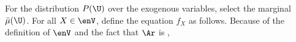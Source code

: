 {%
%
For the distribution $P(\U)$ over the exogenous variables, 
    select the marginal $\bar\mu(\U)$. 
%
For all $X \in \enV$, define the equation $f_X$ as follows.
Because of the definition of $\enV$ and the fact that $\Ar$ is \subpartl, 
}
